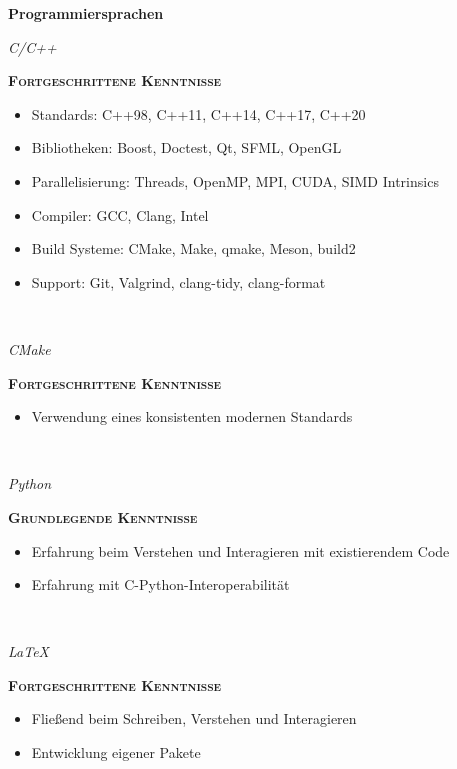 \documentclass[8pt]{article}
\newcommand{\cvEducationHeading}[2]{%
  {\centering\colorbox{cvBackgroundColor}{\parbox{0.98\linewidth}{\textbf{#1} \hfill \textit{\footnotesize #2}}}} \par
}
\newenvironment{cvEducationItem}[2]{
  \medskip
  \par
  \begin{minipage}[c]{0.15\linewidth}
    \raggedleft
    \footnotesize
    \textit{#1}
  \end{minipage}
  \quad
  \vrule
  \quad
  \begin{minipage}[t]{0.7\linewidth}
    \textsc{\color{cvColor} \textbf{#2}}
    \footnotesize
    \begin{itemize}[itemsep=0mm, leftmargin=3mm]
}{
    \end{itemize}
  \end{minipage}
  \\[0.5em]
}
\begin{document}
  \cvEducationHeading{Programmiersprachen}{}
  \begin{multicols}{2}
  \begin{cvEducationItem}{C/C++}{Fortgeschrittene Kenntnisse}
    \item Standards: C++98, C++11, C++14, C++17, C++20
    \item Bibliotheken: Boost, Doctest, Qt, SFML, OpenGL
    \item Parallelisierung: Threads, OpenMP, MPI, CUDA, SIMD Intrinsics
    \item Compiler: GCC, Clang, Intel
    \item Build Systeme: CMake, Make, qmake, Meson, build2
    \item Support: Git, Valgrind, clang-tidy, clang-format
  \end{cvEducationItem}
  \begin{cvEducationItem}{CMake}{Fortgeschrittene Kenntnisse}
    \item Verwendung eines konsistenten modernen Standards
  \end{cvEducationItem}
  \begin{cvEducationItem}{Python}{Grundlegende Kenntnisse}
    \item Erfahrung beim Verstehen und Interagieren mit existierendem Code
    \item Erfahrung mit C-Python-Interoperabilität
  \end{cvEducationItem}
  \begin{cvEducationItem}{LaTeX}{Fortgeschrittene Kenntnisse}
    \item Fließend beim Schreiben, Verstehen und Interagieren
    \item Entwicklung eigener Pakete
  \end{cvEducationItem}
  \end{multicols}

\end{document}
